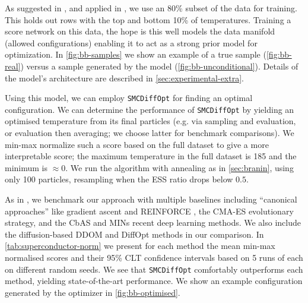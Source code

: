 As suggested in \textcite{trabuccoDesignBenchBenchmarksDataDriven2022}, and applied in
\textcite{kongDiffusionModelsConstrained2024,krishnamoorthyDiffusionModelsBlackBox2023},
we use an 80\% subset of the data for training. This holds out rows with the top and bottom 10\% of
temperatures. Training a score network on this data, the hope is this well models the data manifold
(allowed configurations) enabling it to act as a strong prior model for optimization. In
\autoref{fig:bb-samples} we show an example of a true sample (\autoref{fig:bb-real}) versus a sample
generated by the model (\autoref{fig:bb-unconditional}). Details of the model's architecture are
described in \autoref{sec:experimental-extra}.

Using this model, we can employ \texttt{SMCDiffOpt} for finding an optimal configuration. We can
determine the performance of \texttt{SMCDiffOpt} by yielding an optimised temperature from its final
particles (e.g. via sampling and evaluation, or evaluation then averaging; we choose latter for
benchmark comparisons). We min-max normalize such a score based on the full dataset to give a more
interpretable score; the maximum temperature in the full dataset is 185 and the minimum is
$\approx 0$. We run the algorithm with annealing as in \autoref{sec:branin}, using only 100 particles,
resampling when the ESS ratio drops below $0.5$.

As in \textcite{krishnamoorthyDiffusionModelsBlackBox2023}, we benchmark our approach with multiple
baselines including ``canonical approaches'' like gradient ascent and REINFORCE
\parencite{NIPS1999_464d828b}, the CMA-ES \parencite{Hansen2006} evolutionary strategy, and the CbAS
\parencite{pmlr-v97-brookes19a} and MINs \parencite{NEURIPS2020_373e4c5d} recent deep learning
methods. We also include the diffusion-based DDOM
\parencite{krishnamoorthyDiffusionModelsBlackBox2023} and DiffOpt
\parencite{kongDiffusionModelsConstrained2024} methods in our comparison. In
\autoref{tab:superconductor-norm} we present for each method the mean min-max normalised scores and
their 95\% CLT confidence intervals based on 5 runs of each on different random seeds. We see that
\texttt{SMCDiffOpt} comfortably outperforms each method, yielding state-of-the-art performance. We
show an example configuration generated by the optimizer in \autoref{fig:bb-optimised}.

\begin{table}[t]
    \centering
    \caption{Normalized scores for SuperConductor experiment.}
    \label{tab:superconductor-norm}
\end{table}

